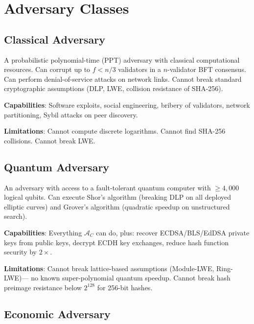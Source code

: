 \section{Adversary Classes}

\label{sec:adversaries}

\subsection{Classical Adversary}

\begin{definition}
A probabilistic polynomial-time (PPT) adversary with classical computational resources.
Can corrupt up to $f < n/3$ validators in a $n$-validator BFT consensus. Can perform
denial-of-service attacks on network links. Cannot break standard cryptographic
assumptions (DLP, LWE, collision resistance of SHA-256).
\end{definition}

\textbf{Capabilities}: Software exploits, social engineering, bribery of validators,
network partitioning, Sybil attacks on peer discovery.

\textbf{Limitations}: Cannot compute discrete logarithms. Cannot find SHA-256
collisions. Cannot break LWE.

\subsection{Quantum Adversary}

\begin{definition}
An adversary with access to a fault-tolerant quantum computer with $\geq 4{,}000$
logical qubits. Can execute Shor's algorithm (breaking DLP on all deployed elliptic
curves) and Grover's algorithm (quadratic speedup on unstructured search).
\end{definition}

\textbf{Capabilities}: Everything $\mathcal{A}_C$ can do, plus: recover ECDSA/BLS/EdDSA
private keys from public keys, decrypt ECDH key exchanges, reduce hash function
security by $2\times$.

\textbf{Limitations}: Cannot break lattice-based assumptions (Module-LWE, Ring-LWE)---
no known super-polynomial quantum speedup. Cannot break hash preimage resistance
below $2^{128}$ for 256-bit hashes.

\subsection{Economic Adversary}

